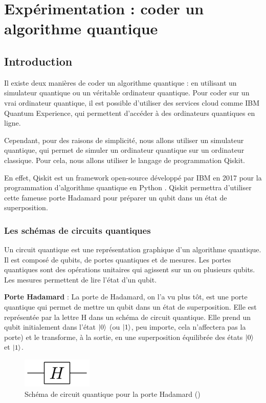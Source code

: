 \documentclass{article}
\begin{document}
\section{Expérimentation : coder un algorithme quantique}

\subsection{Introduction}

Il existe deux manières de coder un algorithme quantique : en utilisant un simulateur quantique
ou un véritable ordinateur quantique. Pour coder sur un vrai ordinateur quantique, il est possible
d'utiliser des services cloud comme IBM Quantum Experience, qui permettent d'accéder à des
ordinateurs quantiques en ligne. \cite{wikipediaQuantumPlatform}

Cependant, pour des raisons de simplicité, nous allons utiliser un simulateur quantique, qui
permet de simuler un ordinateur quantique sur un ordinateur classique. Pour cela, nous allons
utiliser le langage de programmation Qiskit.

En effet, Qiskit est un framework open-source développé par IBM en 2017 pour la programmation
d'algorithme quantique en Python \cite{wikipediaQiskitWikipedia}. Qiskit permettra d'utiliser cette fameuse 
porte Hadamard pour préparer un qubit dans un état de superposition.

\subsubsection{Les schémas de circuits quantiques}

Un circuit quantique est une représentation graphique d'un algorithme quantique. Il est composé
de qubits, de portes quantiques et de mesures. Les portes quantiques sont des opérations
unitaires qui agissent sur un ou plusieurs qubits. Les mesures permettent de lire l'état d'un qubit.

\textbf{Porte Hadamard} :
La porte de Hadamard, on l'a vu plus tôt, est une porte quantique qui permet de mettre un qubit
dans un état de superposition. Elle est représentée par la lettre H dans un schéma de circuit
quantique. Elle prend un qubit initialement dans l'état $\ket{0}$ (ou $\ket{1}$, peu importe, cela n'affectera pas la porte) et le transforme, à la sortie, en une superposition
équilibrée des états $\ket{0}$ et $\ket{1}$.

\begin{figure}[H]
  \centering
  \includegraphics[width=0.3\textwidth]{img/hadamard.png}
  \caption{Schéma de circuit quantique pour la porte Hadamard (\cite{wikipediaPorteQuantique})}
\end{figure}
\end{document}
